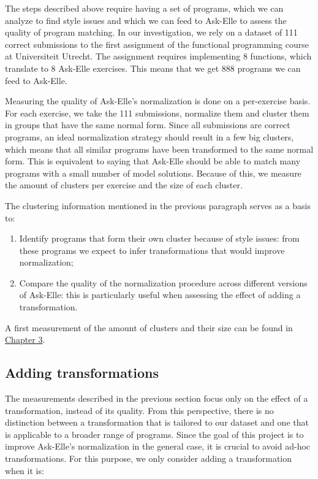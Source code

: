 \documentclass[a4paperpaper,]{report}
\providecommand{\tightlist}{%
  \setlength{\itemsep}{0pt}\setlength{\parskip}{0pt}}
\begin{document}
The steps described above require having a set of programs, which we can
analyze to find style issues and which we can feed to Ask-Elle to assess
the quality of program matching. In our investigation, we rely on a
dataset of 111 correct submissions to the first assignment of the
functional programming course at Universiteit Utrecht. The assignment
requires implementing 8 functions, which translate to 8 Ask-Elle
exercises. This means that we get 888 programs we can feed to Ask-Elle.

Measuring the quality of Ask-Elle's normalization is done on a
per-exercise basis. For each exercise, we take the 111 submissions,
normalize them and cluster them in groups that have the same normal
form. Since all submissions are correct programs, an ideal normalization
strategy should result in a few big clusters, which means that all
similar programs have been transformed to the same normal form. This is
equivalent to saying that Ask-Elle should be able to match many programs
with a small number of model solutions. Because of this, we measure the
amount of clusters per exercise and the size of each cluster.

The clustering information mentioned in the previous paragraph serves as
a basis to:

\begin{enumerate}
\def\labelenumi{\arabic{enumi}.}
\tightlist
\item
  Identify programs that form their own cluster because of style issues:
  from these programs we expect to infer transformations that would
  improve normalization;
\item
  Compare the quality of the normalization procedure across different
  versions of Ask-Elle: this is particularly useful when assessing the
  effect of adding a transformation.
\end{enumerate}

A first measurement of the amount of clusters and their size can be
found in \protect\hyperlink{results}{Chapter 3}.

\hypertarget{adding-transformations}{%
\subsection{Adding transformations}\label{adding-transformations}}

The measurements described in the previous section focus only on the
effect of a transformation, instead of its quality. From this
perspective, there is no distinction between a transformation that is
tailored to our dataset and one that is applicable to a broader range of
programs. Since the goal of this project is to improve Ask-Elle's
normalization in the general case, it is crucial to avoid ad-hoc
transformations. For this purpose, we only consider adding a
transformation when it is:
\end{document}
